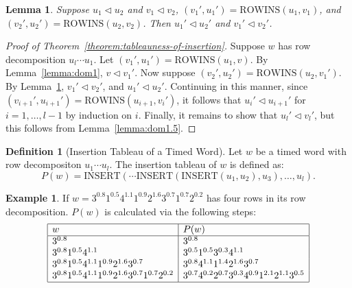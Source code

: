 \documentclass[12pt]{amsart}
\newtheorem{lemma}[theorem]{Lemma}
\theoremstyle{definition}
\newtheorem{definition}[theorem]{Definition}
\newtheorem{example}[theorem]{Example}
\newcommand{\rowins}{\mathrm{ROWINS}}
\newcommand{\ins}{\mathrm{INSERT}}
\begin{document}
\begin{lemma}
  \label{lemma:dom2}
  Suppose $u_1\lhd u_2$ and $v_1\lhd v_2$, $(v_1',u_1')=\rowins(u_1,v_1)$, and $(v_2',u_2')=\rowins(u_2,v_2)$.
  Then $u_1'\lhd u_2'$ and $v_1'\lhd v_2'$.
\end{lemma}
\begin{proof}[Proof of Theorem~\ref{theorem:tableauness-of-insertion}]
  Suppose $w$ has row decomposition $u_l\dotsb u_1$.
  Let $(v_1',u_1')=\rowins(u_1,v)$.
  By Lemma~\ref{lemma:dom1}, $v\lhd v_1'$.
  Now suppose $(v_2',u_2')=\rowins(u_2,v_1')$.
  By Lemma~\ref{lemma:dom2}, $v_1'\lhd v_2'$, and $u_1'\lhd u_2'$.
  Continuing in this manner, since $(v_{i+1}',u_{i+1}')=\rowins(u_{i+1},v_i')$, it follows that $u_i'\lhd u_{i+1}'$ for $i=1,\dotsc,l-1$ by induction on $i$.
  Finally, it remains to show that $u_l'\lhd v_l'$, but this follows from Lemma~\ref{lemma:dom1.5}.
\end{proof}
\begin{definition}
  [Insertion Tableau of a Timed Word]
  Let $w$ be a timed word with row decompositon $u_1\dotsb u_l$.
  The insertion tableau of $w$ is defined as:
  \begin{displaymath}
    P(w) = \ins(\dotsb\ins(\ins(u_1, u_2),u_3),\dotsc,u_l).
  \end{displaymath}
\end{definition}
\begin{example}
  If $w=3^{0.8}1^{0.5}4^{1.1}1^{0.9}2^{1.6}3^{0.7}1^{0.7}2^{0.2}$ has four rows in its row decomposition.
  $P(w)$ is calculated via the following steps:
  \begin{displaymath}
    \begin{array}{|l|l|}
      \hline
      w & P(w)\\
      \hline
      3^{0.8} & 3^{0.8}\\
      3^{0.8}1^{0.5}4^{1.1} & 3^{0.5}1^{0.5}3^{0.3}4^{1.1}\\
      3^{0.8}1^{0.5}4^{1.1}1^{0.9}2^{1.6}3^{0.7} & 3^{0.8}4^{1.1}1^{1.4}2^{1.6}3^{0.7}\\
      3^{0.8}1^{0.5}4^{1.1}1^{0.9}2^{1.6}3^{0.7}1^{0.7}2^{0.2} & 3^{0.7}4^{0.2}2^{0.7}3^{0.3}4^{0.9}1^{2.1}2^{1.1}3^{0.5}\\
      \hline
    \end{array}
  \end{displaymath}
\end{example}
\end{document}
